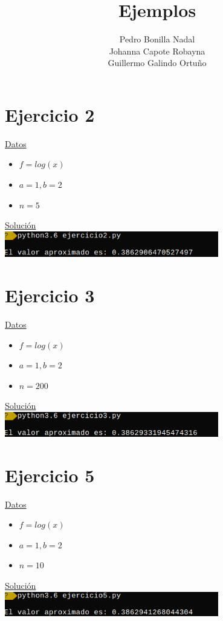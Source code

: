 \documentclass[11pt]{article}
\title{\textbf{Ejemplos}}
\author{Pedro Bonilla Nadal\\
		Johanna Capote Robayna\\
		Guillermo Galindo Ortuño}
\date{}
\begin{document}
\maketitle
\section*{Ejercicio 2} 
\underline{Datos} 
\begin{itemize}
\item $f = log(x)$ 
\item $a = 1, b=2$
\item $ n = 5$

\end{itemize}

\underline{Solución} \\
\includegraphics[width=0.7\textwidth]{../images/dos_1} \\
\section*{Ejercicio 3}
\underline{Datos}
\begin{itemize}
\item $f = log(x)$ 
\item $a = 1, b=2$
\item $ n = 200$

\end{itemize}

\underline{Solución} \\
\includegraphics[width=0.7\textwidth]{../images/tres_1}


\section*{Ejercicio 5}
\underline{Datos}
\begin{itemize}
\item $f = log(x)$ 
\item $a = 1, b=2$
\item $ n = 10$

\end{itemize}

\underline{Solución} \\
\includegraphics[width=0.7\textwidth]{../images/cinco_1} \\
\end{document}
